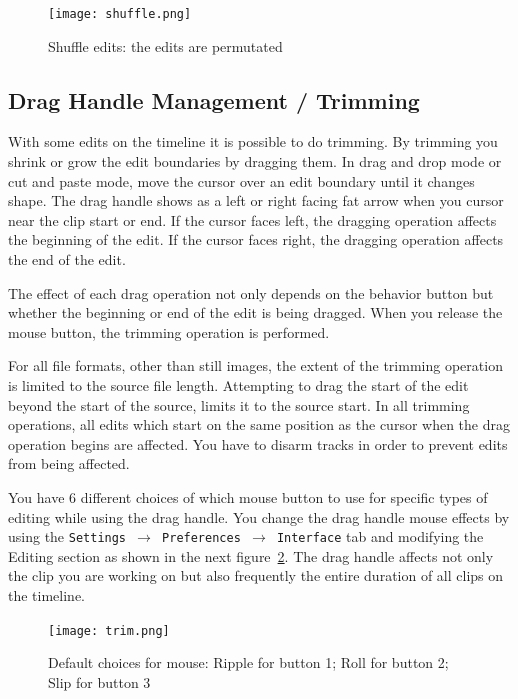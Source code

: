 \begin{figure}[htpb]
  \centering
  \texttt{[image: shuffle.png]}
  \caption{Shuffle edits: the edits are permutated}
  \label{fig:shuffle}
\end{figure}


\subsection{Drag Handle Management / Trimming}%
\label{sub:drag_handle_management_trimming}

With some edits on the timeline it is possible to do trimming. By
trimming you shrink or grow the edit boundaries by dragging them. In
drag and drop mode or cut and paste mode, move the cursor over an
edit boundary until it changes shape. The drag handle shows as a
left or right facing fat arrow when you cursor near the clip start
or end.  If the cursor faces left, the dragging operation affects
the beginning of the edit. If the cursor faces right, the dragging
operation affects the end of the edit.

The effect of each drag operation not only depends on the behavior
button but whether the beginning or end of the edit is being
dragged. When you release the mouse button, the trimming operation
is performed.

For all file formats, other than still images, the extent of the
trimming operation is limited to the source file length. Attempting
to drag the start of the edit beyond the start of the source, limits
it to the source start. In all trimming operations, all edits which
start on the same position as the cursor when the drag operation
begins are affected. You have to disarm tracks in order to prevent
edits from being affected.

You have 6 different choices of which mouse button to use for
specific types of editing while using the drag handle.  You change
the drag handle mouse effects by using the \texttt{Settings
  $\rightarrow$ Preferences  $\rightarrow$ Interface} tab and
modifying the Editing section as shown in the next
figure~\ref{fig:trim}. The drag handle affects not only the clip you
are working on but also frequently the entire duration of all clips
on the timeline.

\begin{figure}[htpb]
  \centering
  \texttt{[image: trim.png]}
  \caption{Default choices for mouse: Ripple for button 1; Roll
    for button 2; Slip for button 3}
  \label{fig:trim}
\end{figure}

